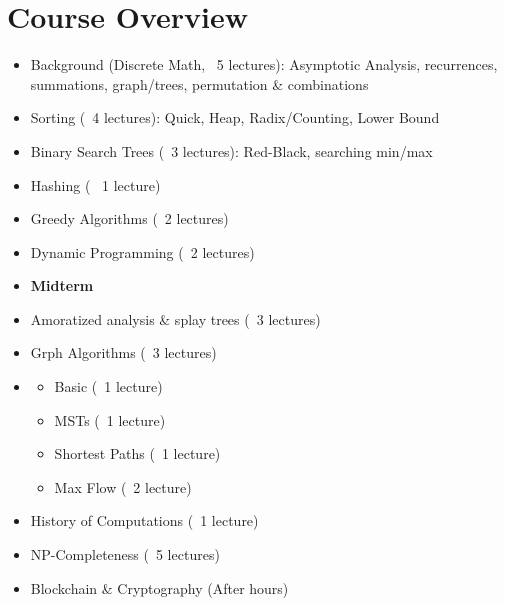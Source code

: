 \section{Course Overview}
\begin{itemize}
    \item Background (Discrete Math, ~5 lectures): Asymptotic Analysis, recurrences, summations, graph/trees, permutation \& combinations
    \item Sorting (~4 lectures): Quick, Heap, Radix/Counting, Lower Bound
    \item Binary Search Trees (~3 lectures): Red-Black, searching min/max
    \item Hashing (~ 1 lecture)
    \item Greedy Algorithms (~2 lectures)
    \item Dynamic Programming (~2 lectures)
    \item \textbf{Midterm}
    \item Amoratized analysis \& splay trees (~3 lectures)
    \item Grph Algorithms (~3 lectures)
    \item \begin{itemize}
              \item Basic (~1 lecture)
              \item MSTs (~1 lecture)
              \item Shortest Paths (~1 lecture)
              \item Max Flow (~2 lecture)
          \end{itemize}
    \item History of Computations (~1 lecture)
    \item NP-Completeness (~5 lectures)
    \item Blockchain \& Cryptography (After hours)
\end{itemize}

